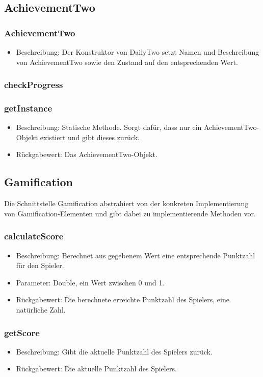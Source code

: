 \documentclass[a4paper]{scrreprt}
\begin{document}
	\subsection{AchievementTwo}
	\subsubsection{AchievementTwo}
	\begin{itemize}
		\item Beschreibung: Der Konstruktor von DailyTwo setzt Namen und Beschreibung von AchievementTwo sowie den Zustand auf den entsprechenden Wert.
	\end{itemize}
	\subsubsection{checkProgress}
	\subsubsection{getInstance}
	\begin{itemize}
		\item Beschreibung: Statische Methode. Sorgt dafür, dass nur ein AchievementTwo-Objekt existiert und gibt dieses zurück.
		\item Rückgabewert: Das AchievementTwo-Objekt.
	\end{itemize}


	\subsection{Gamification}
	Die Schnittstelle Gamification abstrahiert von der konkreten Implementierung von Gamification-Elementen und gibt dabei zu implementierende Methoden vor.
	\subsubsection{calculateScore}
	\begin{itemize}
		\item Beschreibung: Berechnet aus gegebenem Wert eine entsprechende Punktzahl für den Spieler.
		\item Parameter: Double, ein Wert zwischen 0 und 1.
		\item Rückgabewert: Die berechnete erreichte Punktzahl des Spielers, eine natürliche Zahl.
	\end{itemize}
	\subsubsection{getScore}
	\begin{itemize}
		\item Beschreibung: Gibt die aktuelle Punktzahl des Spielers zurück.
		\item Rückgabewert: Die aktuelle Punktzahl des Spielers.
	\end{itemize}
\end{document}
